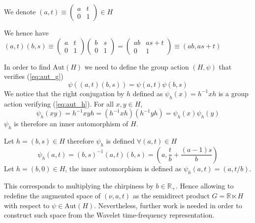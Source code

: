 \documentclass[
  american,
]{article}
\begin{document}
We denote \((a,t)\equiv \begin{pmatrix}a & t\\0 & 1\end{pmatrix}\in H\)

We hence have \((a,t)(b,s)\equiv\begin{pmatrix}a & t\\0 & 1\end{pmatrix}\begin{pmatrix}b & s\\0 & 1\end{pmatrix}=\begin{pmatrix}ab & as+t\\0 & 1\end{pmatrix}\equiv(ab,as+t)\)

In order to find \(\mathrm{Aut}(H)\) we need to define the group action \((H,\psi)\) that verifies (\ref{eq:aut_g})
\begin{equation}\label{eq:aut_h}
\psi((a,t)(b,s)) = \psi(a,t)\psi(b,s)
\end{equation}
We notice that the right conjugation by \(h\) defined as \(\psi_h(x)=h^{-1}xh\)
is a group action verifying (\ref{eq:aut_h}). For all \(x,y\in H\),
\begin{equation}
\psi_h(xy)=h^{-1}xy h=(h^{-1}xh)(h^{-1}yh)=\psi_h(x)\psi_h(y)
\end{equation}
\(\psi_h\) is therefore an inner automorphism of \(H\).

Let \(h=(b,s)\in H\) therefore \(\psi_h\) is defined \(\forall(a,t)\in H\)
\begin{equation}
\psi_h(a,t)=(b,s)^{-1}(a,t)(b,s)=\left(a, \frac{t}{b}+\frac{(a-1)s}{b}\right)
\end{equation}
Let \(h=(b,0)\in H\), the inner automorphism is defined as \(\psi_h(a,t)=(a,t/b)\).

This corresponds to multiplying the chirpiness by \(b\in\mathbb{R}_+\).
Hence allowing to redefine the augmented space of \((\nu,a,t)\)
as the semidirect product \(G=\mathbb{R}\ltimes H\) with respect to \(\psi\in\mathrm{Aut}(H)\).
Nevertheless, further work is needed in order to construct such space
from the Wavelet time-frequency representation.
\end{document}
